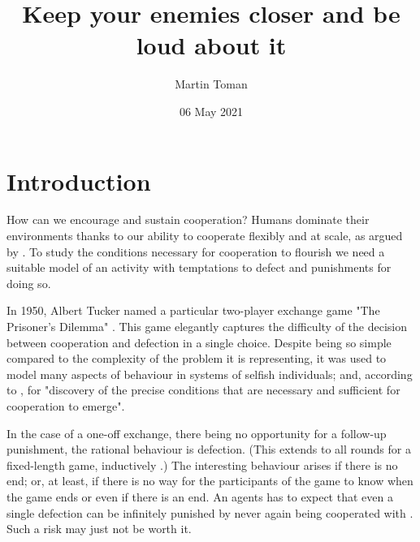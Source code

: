 \documentclass[english]{article}
\begin{document}
\listoftodos

\title{Keep your enemies closer and be loud about it}
\author{Martin Toman}
\date{06 May 2021}
\maketitle



\begin{abstract}

\end{abstract}



\section{Introduction}

How can we encourage and sustain cooperation? Humans dominate their environments thanks to our ability to cooperate flexibly and at scale, as argued by \citet{harari-sapiens}.
To study the conditions necessary for cooperation to flourish we need a suitable model of an activity with temptations to defect and punishments for doing so.

In 1950, Albert Tucker named a particular two-player exchange game "The Prisoner's Dilemma" \citep{sep-prisoner-dilemma}.
This game elegantly captures the difficulty of the decision between cooperation and defection in a single choice.
Despite being so simple compared to the complexity of the problem it is representing, it was used to model many aspects of behaviour in systems of selfish individuals; and, according to \citet{Axelrod84}, for "discovery of the precise conditions that are necessary and sufficient for cooperation to emerge".

In the case of a one-off exchange, there being no opportunity for a follow-up punishment, the rational behaviour is defection. (This extends to all rounds for a fixed-length game, inductively \citep{Axelrod84}.)
The interesting behaviour arises if there is no end; or, at least, if there is no way for the participants of the game to know when the game ends or even if there is an end.
An agents has to expect that even a single defection can be infinitely punished by never again being cooperated with \citep{GRIM}.
Such a risk may just not be worth it.
\end{document}
